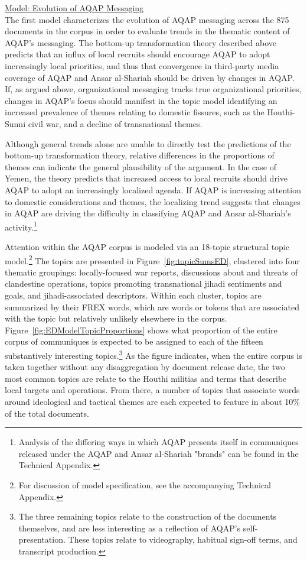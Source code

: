 \underline{Model: Evolution of AQAP Messaging}\\

The first model characterizes the evolution of AQAP messaging across the 875 documents in the corpus in order to evaluate trends in the
thematic content of AQAP's messaging.  The bottom-up transformation
theory described above predicts that an influx of local
recruits should encourage AQAP to adopt increasingly local
priorities, and thus that convergence in third-party media coverage of
AQAP and Ansar al-Shariah should be driven by changes in AQAP.  If, as
argued above, organizational messaging tracks true organizational
priorities, changes in AQAP's focus should manifest in the topic model
identifying an increased prevalence of themes relating to domestic fissures, such as the Houthi-Sunni civil war, and a decline of transnational themes. 

Although general trends alone are unable to directly test the predictions of the bottom-up transformation theory, relative differences in the proportions of themes can indicate the general plausibility of the argument. In the
case of Yemen, the theory predicts that increased access to local
recruits should drive AQAP to adopt an increasingly localized
agenda. If AQAP is increasing attention to domestic considerations and themes, the localizing trend suggests that changes in AQAP are driving the difficulty in classifying AQAP and Ansar al-Shariah's activity.\footnote{Analysis of the differing ways in which AQAP presents itself in communiques released under the AQAP and Ansar al-Shariah "brands" can be found in the Technical Appendix.}

Attention within the AQAP corpus is modeled via an 18-topic structural
topic model.\footnote{For discussion of model specification, see the accompanying Technical Appendix.} The topics are presented in Figure~\ref{fig:topicSumsED}, clustered into four thematic groupings: locally-focused war reports, discussions about and threats of clandestine operations, topics promoting transnational jihadi sentiments and goals, and jihadi-associated descriptors. Within each cluster, topics are summarized by their FREX words, which are words or tokens that are associated with the topic but relatively unlikely elsewhere in the corpus. Figure~\ref{fig:EDModelTopicProportions} shows what proportion of the entire corpus of communiques is expected to be assigned to each of the fifteen substantively interesting topics.\footnote{The three remaining topics relate to the construction of the documents themselves, and are less interesting as a reflection of AQAP's self-presentation. These topics relate to videography, habitual sign-off terms, and transcript production.}  As the figure indicates, when the entire corpus is taken together without any disaggregation by document release date, the two most common topics are relate to the Houthi militias and terms that describe local targets and operations. From there, a number of topics that associate words around ideological and tactical themes are each expected to feature in about 10\% of the total documents.

